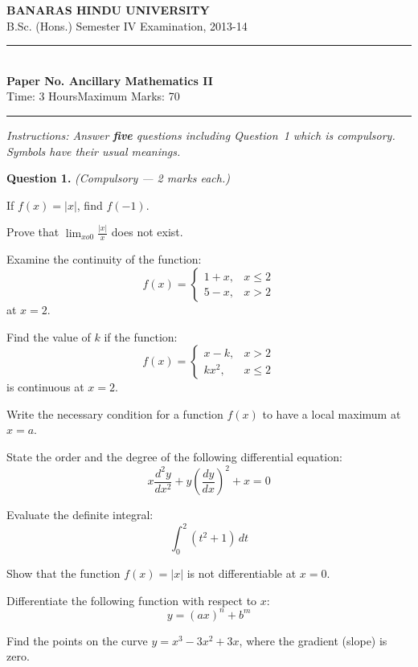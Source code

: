 \documentclass[11pt,a4paper]{article}
\begin{document}
\begin{center}
  {\large\bfseries BANARAS HINDU UNIVERSITY}\\[2pt]
  {\normalsize B.Sc. (Hons.) Semester IV Examination, 2013-14}\\[6pt]
  \rule{0.8\linewidth}{0.5pt}\\[6pt]
  {\large\bfseries Paper No. Ancillary Mathematics II}\\[4pt]
  {\normalsize Time: 3 Hours\hfill Maximum Marks: 70}
\end{center}

\rule{\linewidth}{0.4pt}

\smallskip



\noindent   \textit{Instructions: Answer   \textbf{five} questions including Question~1 which is compulsory. Symbols have their usual meanings.}

\bigskip




\noindent   \textbf{Question 1.}   \textit{(Compulsory --- 2 marks each.)}

\begin{parts}
  \item If $f(x) = |x|$, find $f(-1)$.
  \item Prove that $\lim_{x o 0} \frac{|x|}{x}$ does not exist.
  \item Examine the continuity of the function:
  \[ f(x) = 
\begin{cases} 1+x, & x \le 2 \\ 5-x, & x > 2 \end{cases} \]
  at $x = 2$.
  \item Find the value of $k$ if the function:
  \[ f(x) = 
\begin{cases} x-k, & x > 2 \\ kx^2, & x \le 2 \end{cases} \]
  is continuous at $x = 2$.
  \item Write the necessary condition for a function $f(x)$ to have a local maximum at $x = a$.
  \item State the order and the degree of the following differential equation:
  \[ x \frac{d^2y}{dx^2} + y \left(\frac{dy}{dx}\right)^2 + x = 0 \]
  \item Evaluate the definite integral:
  \[ \int_0^2 (t^2 + 1) \, dt \]
  \item Show that the function $f(x)=|x|$ is not differentiable at $x = 0$.
  \item Differentiate the following function with respect to $x$:
  \[ y = (ax)^n + b^m \]
  \item Find the points on the curve $y=x^3-3x^2+3x$, where the gradient (slope) is zero.
\end{parts}
\end{document}
